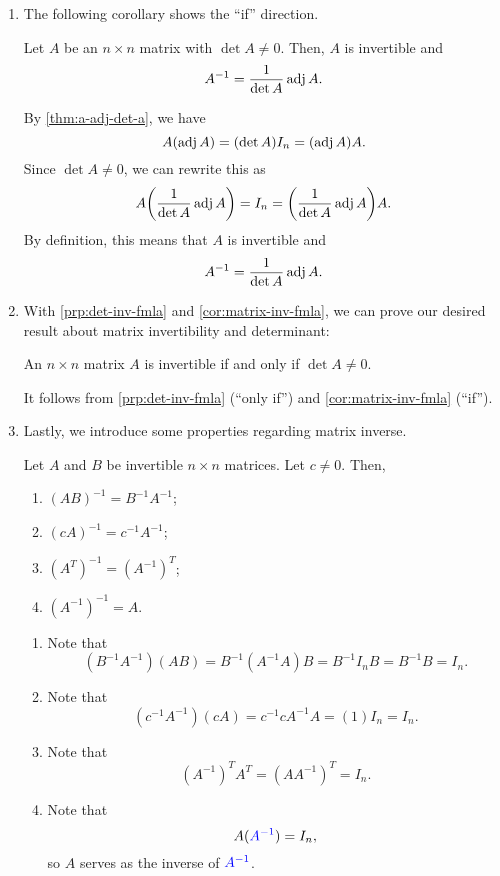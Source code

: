\begin{enumerate}
\item The following corollary shows the ``if'' direction.
\begin{corollary}
\label{cor:matrix-inv-fmla}
Let \(A\) be an \(n\times n\) matrix with \(\det A\ne 0\). Then, \(A\) is
invertible and
\[
A^{-1}=\frac{1}{\det A}\operatorname{adj} A.
\]
\end{corollary}
\begin{pf}
By \cref{thm:a-adj-det-a}, we have
\[
A(\operatorname{adj} A)=(\det A)I_n=(\operatorname{adj} A)A.
\]
Since \(\det A\ne 0\), we can rewrite this as
\[
A\qty(\frac{1}{\det A}\operatorname{adj} A)=I_n=\qty(\frac{1}{\det A}\operatorname{adj} A)A.
\]
By definition, this means that \(A\) is invertible and
\[
A^{-1}=\frac{1}{\det A}\operatorname{adj} A.
\]
\end{pf}
\item With \cref{prp:det-inv-fmla} and \cref{cor:matrix-inv-fmla}, we can prove
our desired result about matrix invertibility and determinant:
\begin{theorem}
\label{thm:inv-iff-nonzero-det}
An \(n\times n\) matrix \(A\) is invertible if and only if \(\det A\ne 0\).
\end{theorem}
\begin{pf}
It follows from \cref{prp:det-inv-fmla} (``only if'') and
\cref{cor:matrix-inv-fmla} (``if'').
\end{pf}
\item Lastly, we introduce some properties regarding matrix inverse.
\begin{proposition}
\label{prp:matrix-inv-prop}
Let \(A\) and \(B\) be invertible \(n\times n\) matrices. Let \(c\ne 0\). Then,
\begin{enumerate}
\item \((AB)^{-1}=B^{-1}A^{-1}\);
\item \((cA)^{-1}=c^{-1}A^{-1}\);
\item \((A^{T})^{-1}=(A^{-1})^{T}\);
\item \((A^{-1})^{-1}=A\).
\end{enumerate}
\end{proposition}
\begin{pf}
\begin{enumerate}
\item Note that
\[
(B^{-1}A^{-1})(AB)=B^{-1}(A^{-1}A)B=B^{-1}I_nB=B^{-1}B=I_n.
\]
\item Note that
\[
(c^{-1}A^{-1})(cA)=c^{-1}cA^{-1}A=(1)I_n=I_n.
\]
\item Note that
\[
(A^{-1})^{T}A^{T}=(AA^{-1})^{T}=I_n.
\]
\item Note that
\[
A({\color{blue}A^{-1}})=I_n,
\]
so \(A\) serves as the inverse of \({\color{blue}A^{-1}}\).
\end{enumerate}
\end{pf}
\end{enumerate}
